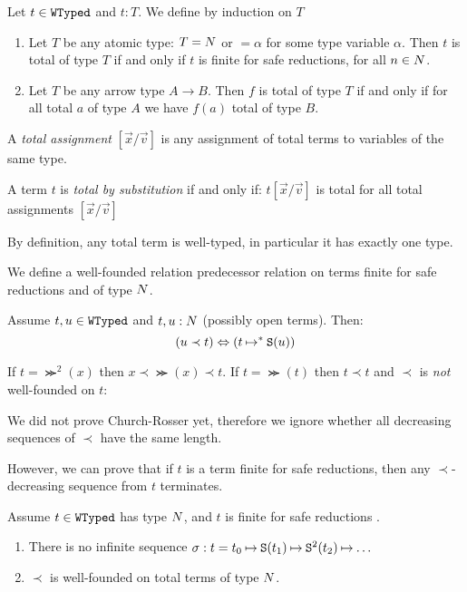 \begin{definition}
\label{definition-total-term}
Let $t \in {\tt WTyped}$ and $t : T$.
We define  by induction on $T$

\begin{enumerate}
\item
Let $T$ be any atomic type: $T = {N}$ or $=\alpha$ for some type variable $\alpha$.
Then $t$ is total of type $T$ if and only if $t$ is finite for safe reductions, for all $n \in {N}$.

\item
Let $T$ be any arrow type $A \rightarrow B$.
Then $f$ is total of type $T$ if and only if for all total $a$ of type $A$ we have $f(a)$ total of type $B$.
\end{enumerate}

A \emph{total assignment} $[\vec{x}/\vec{v}]$ 
is any assignment of total terms to variables of the same type.

A term $t$ is \emph{total by substitution} if and only if:
$t[\vec{x}/\vec{v}]$ is total for all total assignments $[\vec{x}/\vec{v}]$
\end{definition}

By definition, any total term is well-typed, in particular it has exactly one type. 

We define a well-founded relation predecessor relation on terms finite for safe reductions and of type ${N}$.

\begin{definition}
Assume $t, u \in {\tt WTyped}$ and $t, u :{N}$ (possibly open terms).
Then:
$$
(u \prec t) \Leftrightarrow (t \mathbin{\mapsto}^* {\tt S}(u))
$$
\end{definition}


\begin{Eg}
If $t = \Succ^2(x)$ then $x \prec \Succ(x) \prec t$. 
If $t = \Succ(t)$ then $t \prec t$ and $\prec$ is \emph{not} well-founded on $t$:
\end{Eg}

We did not prove Church-Rosser yet, 
therefore we ignore whether all decreasing sequences of $\prec$ have the same length. 

However, we can prove that if $t$ is a term finite for safe reductions, 
then any $\prec$-decreasing sequence from $t$ terminates.


\begin{lemma}
\label{lemma-prec-order}
Assume $t \in {\tt WTyped}$ has type ${N}$, and $t$ is finite for safe reductions .

\begin{enumerate}
\item
\label{lemma-prec-order-01}
There is no infinite sequence 
$\sigma: t = t_0 \mathbin{\mapsto} {\tt S}(t_1) \mathbin{\mapsto} {\tt S}^2(t_2) \mathbin{\mapsto} \ldots$

\item
\label{lemma-prec-order-02}
$\prec$ is well-founded on total terms of type ${N}$.
\end{enumerate}
\end{lemma}


